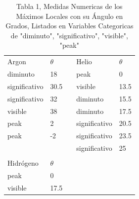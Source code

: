 \documentclass[a4paper,twocolumn,10pt]{article}
\begin{document}
\begin{table}[H]
\centering
\caption{Tabla 1, Medidas Numericas de los Máximos Locales con su Ángulo en Grados, Listados en Variables Categoricas de "diminuto", "significativo", "visible", "peak"}
\begin{tabular}{lllll}
{\cellcolor{cyan}}Argon         & {\cellcolor{cyan}}$\theta$ &  & {\cellcolor{cyan}}Helio    & {\cellcolor{cyan}}$\theta$  \\
diminuto                     & 18                                          &  & peak                       & 0                                            \\
significativo           & 30.5                                        &  & visible                    & 13.5                                         \\
significativo                   & 32                                          &  & diminuto                   & 15.5                                         \\
visible                         & 38                                          &  & diminuto                   & 17.5                                         \\
peak                            & 2                                           &  & significativo              & 20.5                                         \\
peak                            & -2                                          &  & significativo              & 23.5                                         \\
                                &                                             &  & significativo              & 25                                           \\
                                &                                             &  &                            &                                              \\
{\cellcolor{cyan}}Hidrógeno     & {\cellcolor{cyan}}$\theta$ &  &                            &                                              \\
peak                            & 0                                           &  &                            &                                              \\
visible                         & 17.5                                        &  &                            &                                              \\

\end{tabular}
\end{table}
\end{document}
